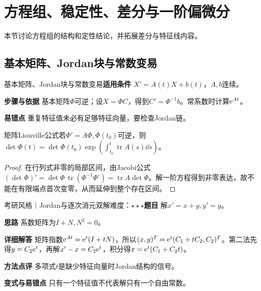 \section{方程组、稳定性、差分与一阶偏微分}\label{deep:ode_qualitative_deep}

\begin{examtip}本节讨论方程组的结构和定性结论，并拓展差分与特征线内容。\end{examtip}

\subsection{基本矩阵、Jordan块与常数变易}\label{deep:ode_qualitative_deep:systems}

\begin{method}{基本矩阵、Jordan块与常数变易}\textbf{适用条件} $X'=A(t)X+b(t)$，$A,b$连续。\par\textbf{步骤与依据} 基本矩阵$\Phi$可逆；设$X=\Phi C$，得到$C'=\Phi^{-1}b$。常系数时计算$\mathrm{e}^{At}$。\par\textbf{易错点} 重复特征值未必有足够特征向量，要检查Jordan链。\end{method}

\begin{theorem}{矩阵Liouville公式}若$\Phi'=A\Phi,\Phi(t_0)$可逆，则$\det\Phi(t)=\det\Phi(t_0)\exp(\int_{t_0}^t\operatorname{tr}A(s)\dd s)$。\end{theorem}\begin{proof}在行列式非零的局部区间，由Jacobi公式$(\det\Phi)'=\det\Phi\,\operatorname{tr}(\Phi^{-1}\Phi')=\operatorname{tr}A\det\Phi$。解一阶方程得到非零表达，故不能在有限端点首次变零，从而延伸到整个存在区间。\end{proof}

\begin{example}{考研风格｜Jordan与逐次消元双解}{难度：$\star\star\star$}\label{deep:ex:ode_qualitative_deep:jordan}\textbf{题目} 解$x'=x+y,y'=y$。\par\textbf{思路} 系数矩阵为$I+N,N^2=0$。\par\textbf{详细解答} 矩阵指数$\mathrm{e}^{At}=\mathrm{e}^t(I+tN)$，所以$(x,y)^T=\mathrm{e}^t(C_1+tC_2,C_2)^T$。第二法先得$y=C_2\mathrm{e}^t$，再解$x'-x=C_2\mathrm{e}^t$，积分得$x=\mathrm{e}^t(C_1+C_2t)$。\par\textbf{方法点评} 多项式$t$是缺少特征向量时Jordan结构的信号。\par\textbf{变式与易错点} 只有一个特征值不代表解只有一个自由常数。\end{example}

